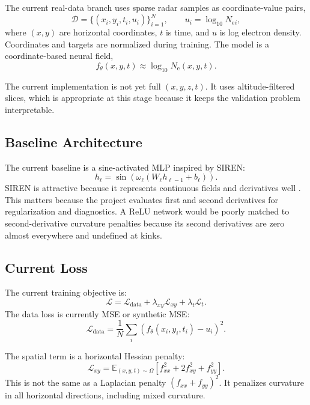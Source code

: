 \documentclass[11pt]{article}
\newcommand{\Ne}{N_{\mathrm e}}
\newcommand{\E}{\mathbb{E}}
\begin{document}
The current real-data branch uses sparse radar samples as coordinate-value pairs,
\begin{equation}
  \mathcal{D} = \{(x_i,y_i,t_i,u_i)\}_{i=1}^{N},
  \qquad
  u_i = \log_{10}\Ne{}_{i},
\end{equation}
where $(x,y)$ are horizontal coordinates, $t$ is time, and $u$ is log electron density.
Coordinates and targets are normalized during training. The model is a coordinate-based neural
field,
\begin{equation}
  f_{\theta}(x,y,t) \approx \log_{10}\Ne(x,y,t).
\end{equation}

The current implementation is not yet full $(x,y,z,t)$. It uses altitude-filtered slices, which is
appropriate at this stage because it keeps the validation problem interpretable.

\subsection{Baseline Architecture}

The current baseline is a sine-activated MLP inspired by SIREN:
\begin{equation}
  h_{\ell} = \sin\left(\omega_{\ell}(W_{\ell}h_{\ell-1}+b_{\ell})\right).
\end{equation}
SIREN is attractive because it represents continuous fields and derivatives well
\cite{Sitzmann2020SIREN}. This matters because the project evaluates first and second derivatives
for regularization and diagnostics. A ReLU network would be poorly matched to second-derivative
curvature penalties because its second derivatives are zero almost everywhere and undefined at
kinks.

\subsection{Current Loss}

The current training objective is:
\begin{equation}
  \mathcal{L}
  =
  \mathcal{L}_{\mathrm{data}}
  +
  \lambda_{xy}\mathcal{L}_{xy}
  +
  \lambda_t\mathcal{L}_t.
\end{equation}
The data loss is currently MSE or synthetic MSE:
\begin{equation}
  \mathcal{L}_{\mathrm{data}}
  =
  \frac{1}{N}\sum_i
  \left(f_{\theta}(x_i,y_i,t_i)-u_i\right)^2.
\end{equation}

The spatial term is a horizontal Hessian penalty:
\begin{equation}
  \mathcal{L}_{xy}
  =
  \E_{(x,y,t)\sim\Omega}
  \left[
    f_{xx}^2 + 2f_{xy}^2 + f_{yy}^2
  \right].
\end{equation}
This is not the same as a Laplacian penalty $(f_{xx}+f_{yy})^2$. It penalizes curvature in all
horizontal directions, including mixed curvature.
\end{document}

